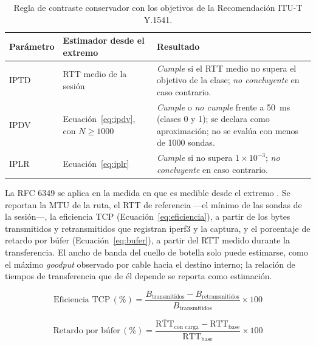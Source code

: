 \begin{table}[htbp]
  \centering
  \caption{Regla de contraste conservador con los objetivos de la Recomendación ITU-T Y.1541.}
  \label{tab:regla_y1541}
  \footnotesize
  \renewcommand{\arraystretch}{1.25}
  \begin{tabularx}{\textwidth}{|p{1.8cm}|p{3.4cm}|>{\raggedright\arraybackslash}X|}
    \hline
    \textbf{Parámetro} & \textbf{Estimador desde el extremo} & \textbf{Resultado} \\
    \hline
    IPTD & RTT medio de la sesión & \textit{Cumple} si el RTT medio no supera el objetivo de la clase; \textit{no concluyente} en caso contrario. \\
    \hline
    IPDV & Ecuación~\ref{eq:ipdv}, con $N \geq 1000$ & \textit{Cumple} o \textit{no cumple} frente a 50~ms (clases 0 y 1); se declara como aproximación; no se evalúa con menos de 1000 sondas. \\
    \hline
    IPLR & Ecuación~\ref{eq:iplr} & \textit{Cumple} si no supera $1\times10^{-3}$; \textit{no concluyente} en caso contrario. \\
    \hline
  \end{tabularx}
  \vspace{2pt}
  \raggedright
\end{table}

La RFC 6349 se aplica en la medida en que es medible desde el extremo \cite{rfc6349}. Se reportan la MTU de la ruta, el RTT de referencia ---el mínimo de las sondas de la sesión---, la eficiencia TCP (Ecuación~\ref{eq:eficiencia}), a partir de los bytes transmitidos y retransmitidos que registran iperf3 y la captura, y el porcentaje de retardo por búfer (Ecuación~\ref{eq:bufer}), a partir del RTT medido durante la transferencia. El ancho de banda del cuello de botella solo puede estimarse, como el máximo \textit{goodput} observado por cable hacia el destino interno; la relación de tiempos de transferencia que de él depende se reporta como estimación.

\begin{equation}
\label{eq:eficiencia}
\text{Eficiencia TCP}\,(\%) = \frac{B_{\text{transmitidos}} - B_{\text{retransmitidos}}}{B_{\text{transmitidos}}} \times 100
\end{equation}

\begin{equation}
\label{eq:bufer}
\text{Retardo por búfer}\,(\%) = \frac{\overline{\mathrm{RTT}}_{\text{con carga}} - \mathrm{RTT}_{\text{base}}}{\mathrm{RTT}_{\text{base}}} \times 100
\end{equation}

